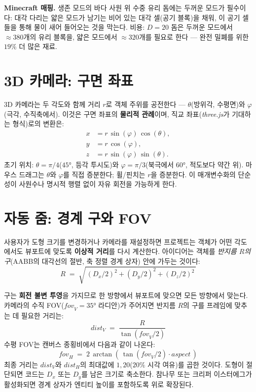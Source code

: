 \documentclass[12pt,a4paper]{scrartcl}
\newcommand{\acc}[1]{\textcolor{accent}{\textbf{#1}}}
\begin{document}
\begin{minec}
\textbf{Minecraft 매핑.} 생존 모드의 바다 사원 위 수중 유리 돔에는 두꺼운 모드가 필수이다: 대각 다리는 얇은 모드가 남기는 비어 있는 대각 셀(공기 블록)을 채워, 이 공기 셀들을 통해 물이 새어 들어오는 것을 막는다. 비용: $D=20$ 돔은 두꺼운 모드에서 $\approx 380$개의 유리 블록을, 얇은 모드에서 $\approx 320$개를 필요로 한다 — 완전 밀폐를 위한 $19\%$ 더 많은 재료.
\end{minec}

\section{3D 카메라: 구면 좌표}

3D 카메라는 두 각도와 함께 거리 $r$로 객체 주위를 공전한다 — $\theta$(방위각, 수평면)와 $\varphi$(극각, 수직축에서). 이것은 구면 좌표의 \acc{물리적 관례}이며, 직교 좌표(\emph{three.js}가 기대하는 형식)로의 변환은:
\[
\begin{aligned}
x &= r\,\sin(\varphi)\,\cos(\theta), \\
y &= r\,\cos(\varphi), \\
z &= r\,\sin(\varphi)\,\sin(\theta).
\end{aligned}
\]
초기 위치: $\theta = \pi/4$($45°$, 등각 투시도)와 $\varphi = \pi/3$(북극에서 $60°$, 적도보다 약간 위). 마우스 드래그는 $\theta$와 $\varphi$를 직접 증분한다; 휠/핀치는 $r$을 증분한다. 이 매개변수화의 단순성이 사원수나 명시적 행렬 없이 자유 회전을 가능하게 한다.

\section{자동 줌: 경계 구와 FOV}

사용자가 도형 크기를 변경하거나 카메라를 재설정하면 프로젝트는 객체가 어떤 각도에서도 뷰포트에 맞도록 \acc{이상적 거리}를 다시 계산한다. 아이디어는 객체를 \emph{반지름 $R$의 구}(AABB의 대각선의 절반, 축 정렬 경계 상자) 안에 가두는 것이다:
\[
R \;=\; \sqrt{\,(D_x/2)^2 + (D_y/2)^2 + (D_z/2)^2\,}
\]

구는 \acc{회전 불변 투영}을 가지므로 한 방향에서 뷰포트에 맞으면 모든 방향에서 맞는다. 카메라의 수직 FOV($\mathit{fov}_V = 35°$ 라디안)가 주어지면 반지름 $R$의 구를 프레임에 맞추는 데 필요한 거리는:
\[
\mathit{dist}_V \;=\; \dfrac{R}{\tan(\mathit{fov}_V / 2)}
\]
수평 FOV는 캔버스 종횡비에서 다음과 같이 나온다:
\[
\mathit{fov}_H \;=\; 2\,\arctan\!\left(\,\tan(\mathit{fov}_V/2)\cdot \mathit{aspect}\,\right)
\]
최종 거리는 $\mathit{dist}_V$와 $\mathit{dist}_H$의 최대값에 $1{,}20$($20\%$ 시각 여유)를 곱한 것이다. 도형이 절단되면 코드는 $D_x$ 또는 $D_y$를 남은 크기로 축소한다. 참나무 또는 크리퍼 이스터에그가 활성화되면 경계 상자가 엔티티 높이를 포함하도록 위로 확장된다.
\end{document}
